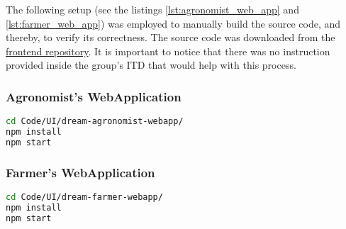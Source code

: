 The following setup (see the listings \ref{lst:agronomist_web_app} and \ref{lst:farmer_web_app}) was employed to manually build the source code, and thereby, to verify its correctness. The source code was downloaded from the \href{https://github.com/marticaffa/CaffagniniFaouziButtiglione/tree/main/Code/UI}{frontend repository}. It is important to notice that there was no instruction provided inside the group's ITD that would help with this process.

\subsubsection*{Agronomist's WebApplication}

\begin{lstlisting}[language=bash, caption={Install dependencies and build \textit{Agronomist's WebApplication}.}, label=lst:agronomist_web_app]
cd Code/UI/dream-agronomist-webapp/
npm install
npm start
\end{lstlisting}

\subsubsection*{Farmer's WebApplication}

\begin{lstlisting}[language=bash, caption={Install dependencies and build \textit{Farmer's WebApplication}.}, label=lst:farmer_web_app]
cd Code/UI/dream-farmer-webapp/
npm install
npm start
\end{lstlisting}
